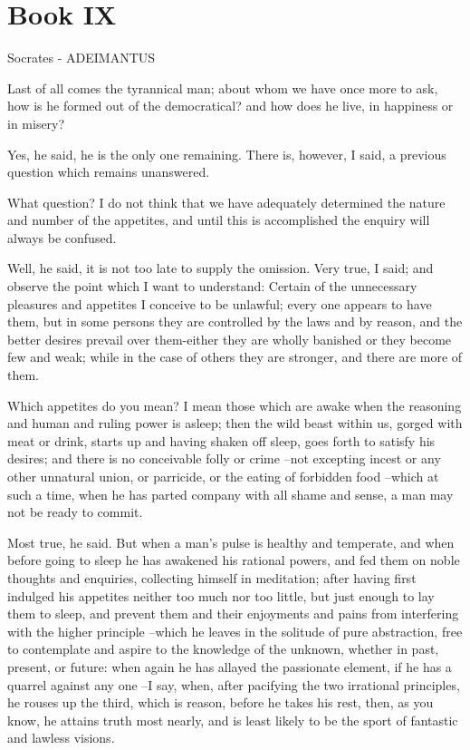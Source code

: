 \chapter{Book IX}

Socrates - ADEIMANTUS

Last of all comes the tyrannical man; about whom we have once more to ask, how is he formed out of the democratical? and how does he live, in happiness or in misery?

Yes, he said, he is the only one remaining.
There is, however, I said, a previous question which remains unanswered.

What question?
I do not think that we have adequately determined the nature and number of the appetites, and until this is accomplished the enquiry will always be confused.

Well, he said, it is not too late to supply the omission.
Very true, I said; and observe the point which I want to understand: Certain of the unnecessary pleasures and appetites I conceive to be unlawful; every one appears to have them, but in some persons they are controlled by the laws and by reason, and the better desires prevail over them-either they are wholly banished or they become few and weak; while in the case of others they are stronger, and there are more of them.

Which appetites do you mean?
I mean those which are awake when the reasoning and human and ruling power is asleep; then the wild beast within us, gorged with meat or drink, starts up and having shaken off sleep, goes forth to satisfy his desires; and there is no conceivable folly or crime --not excepting incest or any other unnatural union, or parricide, or the eating of forbidden food --which at such a time, when he has parted company with all shame and sense, a man may not be ready to commit.

Most true, he said.
But when a man's pulse is healthy and temperate, and when before going to sleep he has awakened his rational powers, and fed them on noble thoughts and enquiries, collecting himself in meditation; after having first indulged his appetites neither too much nor too little, but just enough to lay them to sleep, and prevent them and their enjoyments and pains from interfering with the higher principle --which he leaves in the solitude of pure abstraction, free to contemplate and aspire to the knowledge of the unknown, whether in past, present, or future: when again he has allayed the passionate element, if he has a quarrel against any one --I say, when, after pacifying the two irrational principles, he rouses up the third, which is reason, before he takes his rest, then, as you know, he attains truth most nearly, and is least likely to be the sport of fantastic and lawless visions.

